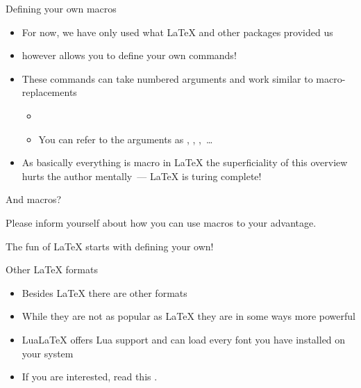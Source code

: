 \begin{frame}{Defining your own macros}
\begin{itemize}
   \itemsep4pt
   \item For now, we have only used what \LaTeX{} and other packages provided us
   \item \blatex{\\newcommand} however allows you to define your own commands!
   \item These commands can take numbered arguments and work similar to macro-replacements \begin{itemize}
      \item {}
      \item You can refer to the arguments as , , ,~\ldots
   \end{itemize}
   \item As basically everything is macro in \LaTeX{} the superficiality of this overview hurts the author mentally~--- \LaTeX{} is turing complete!
\end{itemize}
\end{frame}

\begin{frame}{And macros?}
   \begin{center}
      Please inform yourself about how you can use macros to your advantage.\smallskip

      The fun of \LaTeX{} starts with defining your own!
   \end{center}
\end{frame}

\begin{frame}{Other \LaTeX{} formats}
   \begin{itemize}
      \itemsep8pt
      \item Besides \LaTeX{} there are other formats
      \item While they are not as popular as \LaTeX{} they are in some ways more powerful
      \item Lua\LaTeX{} offers Lua support and can load every font you have installed on your system
      \item If you are interested, read this .
   \end{itemize}
\end{frame}

